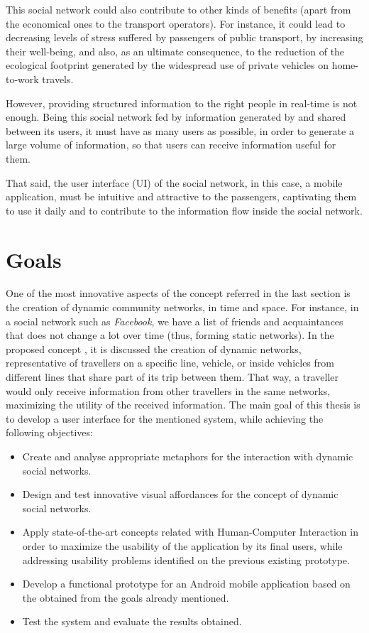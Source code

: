 This social network could also contribute to other kinds of benefits (apart from the economical ones to the transport operators\cite{kn:NGeC13}). For instance, it could lead to decreasing levels of stress suffered by passengers of public transport, by increasing their well-being, and also, as an ultimate consequence, to the reduction of the ecological footprint generated by the widespread use of private vehicles on home-to-work travels.

However, providing structured information to the right people in real-time is not enough. Being this social network fed by information generated by and shared between its users, it must have as many users as possible, in order to generate a large volume of information, so that users can receive information useful for them.

That said, the user interface (UI) of the social network, in this case, a mobile application, must be intuitive and attractive to the passengers, captivating them to use it daily and to contribute to the information flow inside the social network. 

\section{Goals} \label{sec:goals}

One of the most innovative aspects of the concept referred in the last section is the creation of dynamic community networks, in time and space. For instance, in a social network such as \emph{Facebook}, we have a list of friends and acquaintances that does not change a lot over time (thus, forming static networks). In the proposed concept \cite{kn:NGeCP11}, it is discussed the creation of dynamic networks, representative of travellers on a specific line, vehicle, or inside vehicles from different lines that share part of its trip between them. That way, a traveller would only receive information from other travellers in the same networks, maximizing the utility of the received information.
The main goal of this thesis is to develop a user interface for the mentioned system, while achieving the following objectives:

\begin{itemize}
\item Create and analyse appropriate metaphors for the interaction with dynamic social networks.
\item Design and test innovative visual affordances for the concept of dynamic social networks.
\item Apply state-of-the-art concepts related with Human-Computer Interaction in order to maximize the usability of the application by its final users, while addressing usability problems identified on the previous existing prototype.
\item Develop a functional prototype for an Android mobile application based on the obtained from the goals already mentioned.
\item Test the system and evaluate the results obtained.
\end{itemize}

